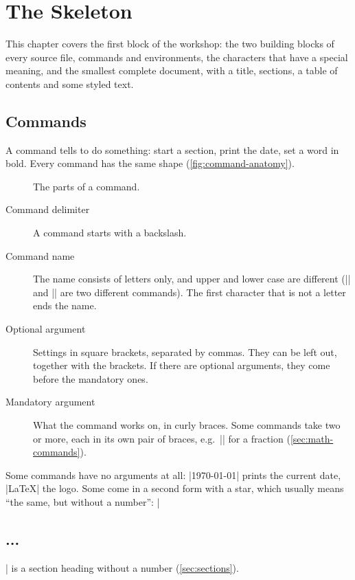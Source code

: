 \chapter{The Skeleton}\label{chap:skeleton}

This chapter covers the first block of the workshop:
the two building blocks of every  source file, commands and environments,
the characters that have a special meaning,
and the smallest complete document, with a title, sections, a table of contents and some styled text.

\section{Commands}\label{sec:commands}

A command tells  to do something: start a section, print the date, set a word in bold.
Every command has the same shape (\autoref{fig:command-anatomy}).

\begin{figure}[htbp]
    \centering
    
    \caption{The parts of a command.}
    \label{fig:command-anatomy}
\end{figure}

\begin{description}
    \item[Command delimiter]
        A command starts with a backslash.
    \item[Command name]
        The name consists of letters only, and upper and lower case are different
        (\code|\Delta| and \code|\delta| are two different commands).
        The first character that is not a letter ends the name.
    \item[Optional argument]
        Settings in square brackets, separated by commas.
        They can be left out, together with the brackets.
        If there are optional arguments, they come before the mandatory ones.
    \item[Mandatory argument]
        What the command works on, in curly braces.
        Some commands take two or more, each in its own pair of braces,
        e.g.\ \code|| for a fraction (\autoref{sec:math-commands}).
\end{description}

Some commands have no arguments at all:
\code|\today| prints the current date, \code|\LaTeX| the logo.
Some come in a second form with a star, which usually means \enquote{the same, but without a number}:
\code|\section*{...}| is a section heading without a number (\autoref{sec:sections}).

